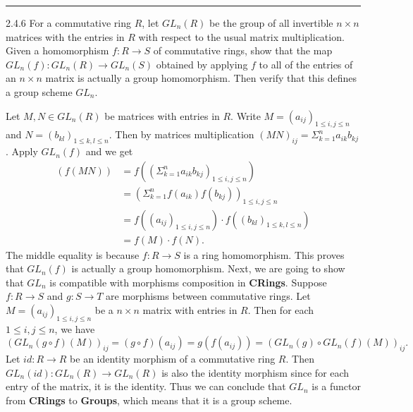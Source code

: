 \documentclass[a4paper, 12pt]{article}
\begin{document}
\noindent\rule{7in}{2.8pt}
\begin{problem}{2.4.6}
For a commutative ring \(R\), let \(GL_n(R)\) be the group of all invertible \(n\times n\) matrices with the entries in \(R\) with respect to the usual matrix multiplication. 
Given a homomorphism \(f:R\rightarrow S\) of commutative rings, show that the map \(GL_n(f):GL_n(R)\rightarrow GL_n(S)\) obtained by applying \(f\) to all of the entries of an \(n\times n\) matrix 
is actually a group homomorphism. Then verify that this defines a group scheme \(GL_n\).
\end{problem}
\begin{solution}
Let \(M,N\in GL_n(R)\) be matrices with entries in \(R\). Write \(M=(a_{ij})_{1\leq i,j\leq n}\) and \(N=(b_{kl})_{1\leq k,l\leq n}\). Then by matrices multiplication \((MN)_{ij}=\Sigma_{k=1}^n a_{ik}b_{kj}\). Apply \(GL_n(f)\) and we get 
\begin{align*}
(f(MN)) & =f((\Sigma_{k=1}^n a_{ik}b_{kj})_{1\leq i,j\leq n})\\ 
        & =(\Sigma_{k=1}^n f(a_{ik})f(b_{kj}))_{1\leq i,j\leq n}\\ 
        & =f((a_{ij})_{1\leq i,j\leq n})\cdot f((b_{kl})_{1\leq k,l\leq n})\\ 
        & =f(M)\cdot f(N).
\end{align*}
The middle equality is because \(f:R\rightarrow S\) is a ring homomorphism. This proves that \(GL_n(f)\) is actually a group homomorphism. 
Next, we are going to show that \(GL_n\) is compatible with morphisms composition in \textbf{CRings}. Suppose \(f:R\rightarrow S\) and \(g:S\rightarrow T\) are morphisms between commutative rings. 
Let \(M=(a_{ij})_{1\leq i,j\leq n}\) be a \(n\times n\) matrix with entries in \(R\). Then for each \(1\leq i,j\leq n\), we have 
$$(GL_n(g\circ f)(M))_{ij}=(g\circ f)(a_{ij})=g(f(a_{ij}))=(GL_n(g)\circ GL_n(f)(M))_{ij}.$$
Let \(id:R\rightarrow R\) be an identity morphism of a commutative ring \(R\). Then \(GL_n(id):GL_n(R)\rightarrow GL_n(R)\) is also the identity morphism since for each entry of the matrix, it is the identity. Thus we can conclude that 
\(GL_n\) is a functor from \textbf{CRings} to \textbf{Groups}, which means that it is a group scheme. 
\end{solution}
\end{document}
